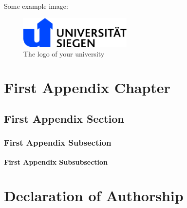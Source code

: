 \documentclass[
thesis%
]{csthes}
\begin{document}
Some example image:
\begin{figure}[hb!]
\centering
  \includegraphics[width=0.5\textwidth]{images/logos/uni_siegen_logo}
    \caption{The logo of your university}
\end{figure}


\appendix
\chapter{First Appendix Chapter}
\section{First Appendix Section}
\subsection{First Appendix Subsection}
\subsubsection{First Appendix Subsubsection}

\cleardoublepage



\chapter*{Declaration of Authorship}
\end{document}
